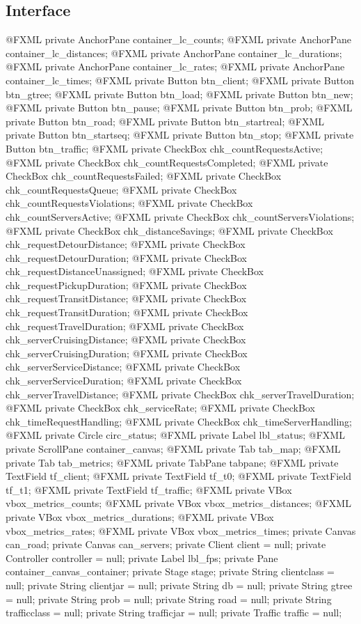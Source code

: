 \subsection{Interface}
\nwenddocs{}\plusendmoddef
@FXML private AnchorPane container_lc_counts;
@FXML private AnchorPane container_lc_distances;
@FXML private AnchorPane container_lc_durations;
@FXML private AnchorPane container_lc_rates;
@FXML private AnchorPane container_lc_times;
@FXML private Button btn_client;
@FXML private Button btn_gtree;
@FXML private Button btn_load;
@FXML private Button btn_new;
@FXML private Button btn_pause;
@FXML private Button btn_prob;
@FXML private Button btn_road;
@FXML private Button btn_startreal;
@FXML private Button btn_startseq;
@FXML private Button btn_stop;
@FXML private Button btn_traffic;
@FXML private CheckBox chk_countRequestsActive;
@FXML private CheckBox chk_countRequestsCompleted;
@FXML private CheckBox chk_countRequestsFailed;
@FXML private CheckBox chk_countRequestsQueue;
@FXML private CheckBox chk_countRequestsViolations;
@FXML private CheckBox chk_countServersActive;
@FXML private CheckBox chk_countServersViolations;
@FXML private CheckBox chk_distanceSavings;
@FXML private CheckBox chk_requestDetourDistance;
@FXML private CheckBox chk_requestDetourDuration;
@FXML private CheckBox chk_requestDistanceUnassigned;
@FXML private CheckBox chk_requestPickupDuration;
@FXML private CheckBox chk_requestTransitDistance;
@FXML private CheckBox chk_requestTransitDuration;
@FXML private CheckBox chk_requestTravelDuration;
@FXML private CheckBox chk_serverCruisingDistance;
@FXML private CheckBox chk_serverCruisingDuration;
@FXML private CheckBox chk_serverServiceDistance;
@FXML private CheckBox chk_serverServiceDuration;
@FXML private CheckBox chk_serverTravelDistance;
@FXML private CheckBox chk_serverTravelDuration;
@FXML private CheckBox chk_serviceRate;
@FXML private CheckBox chk_timeRequestHandling;
@FXML private CheckBox chk_timeServerHandling;
@FXML private Circle circ_status;
@FXML private Label lbl_status;
@FXML private ScrollPane container_canvas;
@FXML private Tab tab_map;
@FXML private Tab tab_metrics;
@FXML private TabPane tabpane;
@FXML private TextField tf_client;
@FXML private TextField tf_t0;
@FXML private TextField tf_t1;
@FXML private TextField tf_traffic;
@FXML private VBox vbox_metrics_counts;
@FXML private VBox vbox_metrics_distances;
@FXML private VBox vbox_metrics_durations;
@FXML private VBox vbox_metrics_rates;
@FXML private VBox vbox_metrics_times;
private Canvas can_road;
private Canvas can_servers;
private Client client = null;
private Controller controller = null;
private Label lbl_fps;
private Pane container_canvas_container;
private Stage stage;
private String clientclass = null;
private String clientjar = null;
private String db = null;
private String gtree = null;
private String prob = null;
private String road = null;
private String trafficclass = null;
private String trafficjar = null;
private Traffic traffic = null;
\nwendcode{}\nwdocspar

